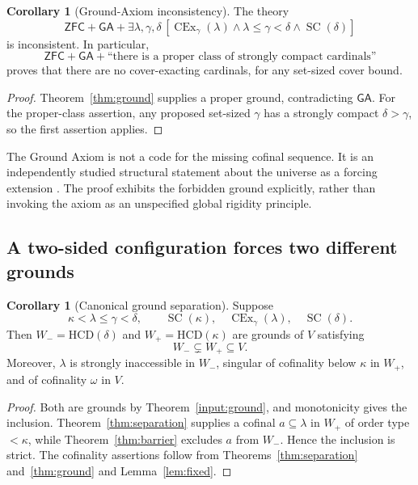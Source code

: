 \documentclass[11pt,letterpaper]{article}
\theoremstyle{definition}
\newtheorem{corollary}[definition]{Corollary}
\newcommand{\ZFC}{\mathsf{ZFC}}
\newcommand{\SC}{\operatorname{SC}}
\newcommand{\CEx}{\operatorname{CEx}}
\newcommand{\HCD}{\mathrm{HCD}}
\newcommand{\GA}{\mathsf{GA}}
\begin{document}
\begin{corollary}[Ground-Axiom inconsistency]\label{cor:ga}
The theory
\begin{equation}\label{eq:ga}
 \ZFC+\GA+\exists\lambda,\gamma,\delta\,
 [\CEx_\gamma(\lambda)\wedge\lambda\leq\gamma<\delta\wedge\SC(\delta)]
\end{equation}
is inconsistent. In particular,
\begin{equation}\label{eq:gapc}
 \ZFC+\GA+\text{``there is a proper class of strongly compact cardinals''}
\end{equation}
proves that there are no cover-exacting cardinals, for any set-sized cover bound.
\end{corollary}

\begin{proof}
Theorem~\ref{thm:ground} supplies a proper ground, contradicting $\GA$. For the proper-class assertion, any proposed set-sized $\gamma$ has a strongly compact $\delta>\gamma$, so the first assertion applies.
\end{proof}

The Ground Axiom is not a code for the missing cofinal sequence. It is an independently studied structural statement about the universe as a forcing extension \cite{reitz}. The proof exhibits the forbidden ground explicitly, rather than invoking the axiom as an unspecified global rigidity principle.

\subsection{A two-sided configuration forces two different grounds}

\begin{corollary}[Canonical ground separation]\label{cor:sandwich}
Suppose
\[
     \kappa<\lambda\leq\gamma<\delta,
     \qquad\SC(\kappa),\quad\CEx_\gamma(\lambda),\quad\SC(\delta).
\]
Then $W_-=\HCD(\delta)$ and $W_+=\HCD(\kappa)$ are grounds of $V$ satisfying
\begin{equation}\label{eq:groundchain}
                   W_-\subsetneq W_+\subseteq V.
\end{equation}
Moreover, $\lambda$ is strongly inaccessible in $W_-$, singular of cofinality below $\kappa$ in $W_+$, and of cofinality $\omega$ in $V$.
\end{corollary}

\begin{proof}
Both are grounds by Theorem~\ref{input:ground}, and monotonicity gives the inclusion. Theorem~\ref{thm:separation} supplies a cofinal $a\subseteq\lambda$ in $W_+$ of order type $<\kappa$, while Theorem~\ref{thm:barrier} excludes $a$ from $W_-$. Hence the inclusion is strict. The cofinality assertions follow from Theorems~\ref{thm:separation} and~\ref{thm:ground} and Lemma~\ref{lem:fixed}.
\end{proof}
\end{document}
